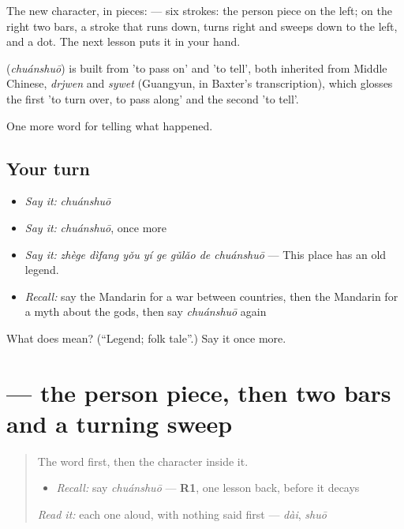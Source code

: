 The new character, in pieces:  — six strokes: the person piece  on the left; on the right two bars, a stroke that runs down, turns right and sweeps down to the left, and a dot. The next lesson puts it in your hand.

\begin{cousinweb}
\textbf{} (\emph{chuánshuō}) is built from  'to pass on' and  'to tell', both inherited from Middle Chinese, \emph{drjwen} and \emph{sywet} (Guangyun, in Baxter's transcription), which glosses the first 'to turn over, to pass along' and the second 'to tell'.
\end{cousinweb}

\begin{grammarlens}[title={What you've built}]
One more word for telling what happened.
\end{grammarlens}

\subsection*{Your turn}
\begin{itemize}
\raggedright
  \item \emph{Say it:} \emph{chuánshuō}
  \item \emph{Say it:} \emph{chuánshuō}, once more
  \item \emph{Say it:} \emph{zhège dìfang yǒu yí ge gǔlǎo de chuánshuō} — This place has an old legend.
  \item \emph{Recall:} say the Mandarin for a war between countries, then the Mandarin for a myth about the gods, then say \emph{chuánshuō} again
\end{itemize}

\begin{tcolorbox}[breakable,colback=teal!4,colframe=teal!35!black,title={Before you move on}]
What does  mean? (\textquotedblleft{}Legend; folk tale\textquotedblright{}.) Say it once more.
\end{tcolorbox}
\section[\texorpdfstring{\zh{传} (chuán)}{传 (chuán)}]{ — the person piece, then two bars and a turning sweep}

\label{lesson:ZH-W328-chuan-pass}



\begin{quote}
The word first, then the character inside it.

\begin{itemize}
\raggedright
  \item \emph{Recall:} say \emph{chuánshuō} — \textbf{R1}, one lesson back, before it decays
\end{itemize}

\begin{quote}
 
\end{quote}

\emph{Read it:} each one aloud, with nothing said first — \emph{dài}, \emph{shuō}
\end{quote}


